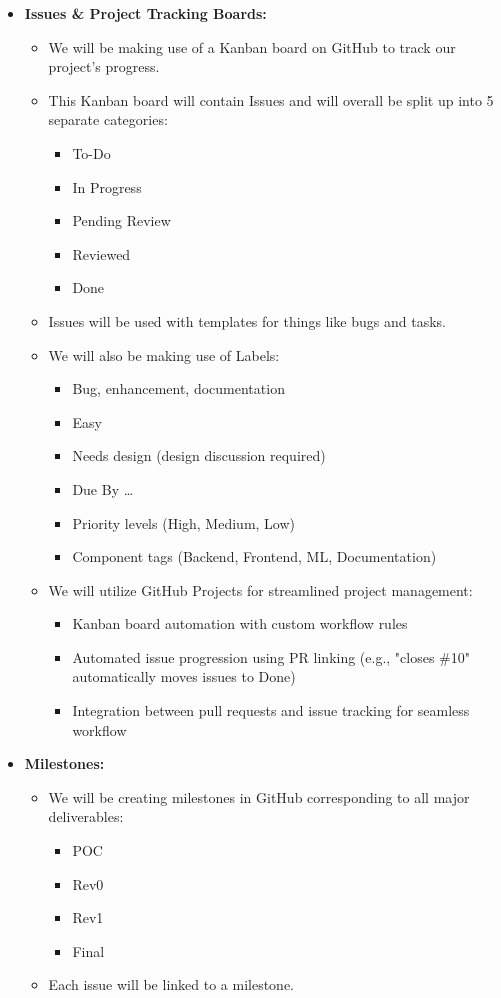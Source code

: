 \documentclass{article}
\begin{document}
\begin{itemize}
    \item \textbf{Issues \& Project Tracking Boards:}
    \begin{itemize}
        \item We will be making use of a Kanban board on GitHub to track our project’s progress.
        \item This Kanban board will contain Issues and will overall be split up into 5 separate categories:
        \begin{itemize}
            \item To-Do
            \item In Progress
            \item Pending Review
            \item Reviewed
            \item Done
        \end{itemize}
        \item Issues will be used with templates for things like bugs and tasks.
        \item We will also be making use of Labels:
        \begin{itemize}
            \item Bug, enhancement, documentation
            \item Easy
            \item Needs design (design discussion required)
            \item Due By \dots
            \item Priority levels (High, Medium, Low)
            \item Component tags (Backend, Frontend, ML, Documentation)
        \end{itemize}
        \item We will utilize GitHub Projects for streamlined project management:
        \begin{itemize}
            \item Kanban board automation with custom workflow rules
            \item Automated issue progression using PR linking (e.g., "closes \#10" automatically moves issues to Done)
            \item Integration between pull requests and issue tracking for seamless workflow
        \end{itemize}
    \end{itemize}

    \item \textbf{Milestones:}
    \begin{itemize}
        \item We will be creating milestones in GitHub corresponding to all major deliverables:
        \begin{itemize}
            \item POC
            \item Rev0
            \item Rev1
            \item Final
        \end{itemize}
        \item Each issue will be linked to a milestone.
    \end{itemize}


\end{itemize}
\end{document}
